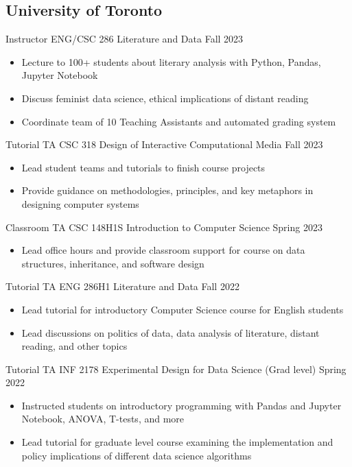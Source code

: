 \subsection{University of Toronto}

Instructor ENG/CSC 286 Literature and Data \hfill Fall 2023\\
\begin{itemize} 
\item Lecture to 100+ students about literary analysis with Python, Pandas, Jupyter Notebook
\item Discuss feminist data science, ethical implications of distant reading
\item Coordinate team of 10 Teaching Assistants and automated grading system
\end{itemize} 

Tutorial TA CSC 318 Design of Interactive Computational Media \hfill Fall 2023\\
\begin{itemize} 
\item Lead student teams and tutorials to finish course projects
\item Provide guidance on methodologies, principles, and key metaphors in designing computer systems
\end{itemize} 

Classroom TA CSC 148H1S Introduction to Computer Science \hfill Spring 2023\\
\begin{itemize} 
\item Lead office hours and provide classroom support for course on data structures, inheritance, and software design
\end{itemize} 

Tutorial TA ENG 286H1 Literature and Data \hfill Fall 2022\\
\begin{itemize} 
\item Lead tutorial for introductory Computer Science course for English students
\item Lead discussions on politics of data, data analysis of literature, distant reading, and other topics
\end{itemize} 

Tutorial TA INF 2178 Experimental Design for Data Science (Grad level) \hfill Spring 2022\\
\begin{itemize} 
\item Instructed students on introductory programming with Pandas and Jupyter Notebook, ANOVA, T-tests, and more
\item Lead tutorial for graduate level course examining the implementation and policy implications of different data science algorithms 
\end{itemize} 

